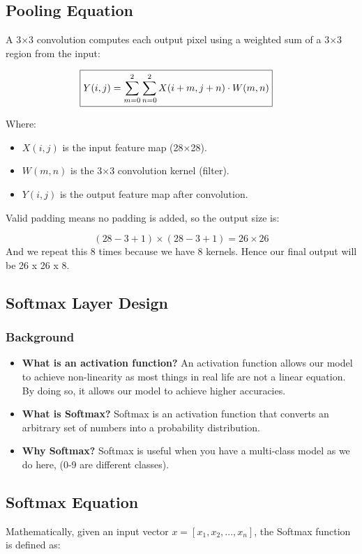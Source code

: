 \documentclass{article}
\begin{document}
\subsection{Pooling Equation}
A 3×3 convolution computes each output pixel using a weighted sum of a 3×3 region from the input:

\begin{align*}
  \Aboxed{ Y(i, j) &= \sum_{m=0}^{2} \sum_{n=0}^{2} X(i+m, j+n) \cdot W(m, n)}
\end{align*}

Where:
\begin{itemize}
  \item \( X(i, j) \) is the input feature map (28×28).
  \item \( W(m, n) \) is the 3×3 convolution kernel (filter).
  \item \( Y(i, j) \) is the output feature map after convolution.
\end{itemize}

Valid padding means no padding is added, so the output size is:

\[
(28-3+1) \times (28-3+1) = 26 \times 26
\]
And we repeat this 8 times because we have 8 kernels. Hence our final output will be 26 x 26 x 8.

\subsection{Softmax Layer Design}
\subsubsection{Background} 
\begin{itemize}
  \item \textbf{What is an activation function?}
    An activation function allows our model to achieve non-linearity as most things in real life are not a linear equation. By doing so, it allows our model to achieve higher accuracies.
  \item \textbf{What is Softmax?} 
    Softmax is an activation function that converts an arbitrary set of numbers into a probability distribution. 
  \item \textbf{Why Softmax?} 
      Softmax is useful when you have a multi-class model as we do here, (0-9 are different classes). 
\end{itemize}

\subsection{Softmax Equation} 
Mathematically, given an input vector \( x = [x_1, x_2, ..., x_n] \), the Softmax function is defined as:
\end{document}
